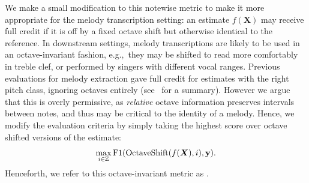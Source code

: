 We make a small modification to this notewise metric to make it more appropriate for the melody transcription setting: an estimate $f(\bm{X})$ may receive full credit if it is off by a fixed octave shift but otherwise identical to the reference. 
In downstream settings, melody transcriptions are likely to be used in an octave-invariant fashion, e.g.,~they may be shifted to read more comfortably in treble clef, or performed by singers with different vocal ranges. 
Previous evaluations for melody extraction gave full credit for estimates with the right pitch class, ignoring octaves entirely (see~\cite{poliner2007melody} for a summary). 
However we argue that this is overly permissive, as \emph{relative} octave information preserves intervals between notes, and thus may be critical to the identity of a melody. 
Hence, we modify the evaluation criteria by simply taking the highest score over octave shifted versions of the estimate:
\begin{equation*}
    \max_{i \in \mathbb{Z}} \text{F1}(\text{OctaveShift}(f(\mbox{\boldmath{$X$}}), i), \mathbf{y}).
\end{equation*}
Henceforth, we refer to this octave-invariant metric as \fone. 